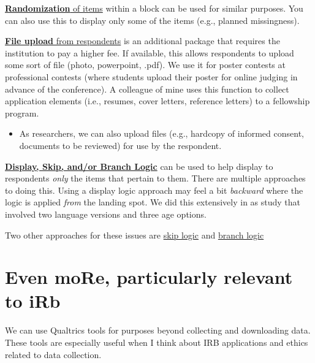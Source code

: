 \documentclass[
  english,
]{book}
\providecommand{\tightlist}{%
  \setlength{\itemsep}{0pt}\setlength{\parskip}{0pt}}
\begin{document}
\href{https://www.qualtrics.com/support/survey-platform/survey-module/block-options/question-randomization/}{\textbf{Randomization} of items} within a block can be used for similar purposes. You can also use this to display only some of the items (e.g., planned missingness).

\href{https://www.qualtrics.com/support/survey-platform/survey-module/editing-questions/question-types-guide/advanced/file-upload/}{\textbf{File upload} from respondents} is an additional package that requires the institution to pay a higher fee. If available, this allows respondents to upload some sort of file (photo, powerpoint, .pdf). We use it for poster contests at professional contests (where students upload their poster for online judging in advance of the conference). A colleague of mine uses this function to collect application elements (i.e., resumes, cover letters, reference letters) to a fellowship program.

\begin{itemize}
\tightlist
\item
  As researchers, we can also upload files (e.g., hardcopy of informed consent, documents to be reviewed) for use by the respondent.
\end{itemize}

\href{https://www.qualtrics.com/support/survey-platform/survey-module/question-options/display-logic/}{\textbf{Display, Skip, and/or Branch Logic}} can be used to help display to respondents \emph{only} the items that pertain to them. There are multiple approaches to doing this. Using a display logic approach may feel a bit \emph{backward} where the logic is applied \emph{from} the landing spot. We did this extensively in as study that involved two language versions and three age options.

Two other approaches for these issues are \href{https://www.qualtrics.com/support/survey-platform/survey-module/question-options/skip-logic/}{skip logic} and \href{https://www.qualtrics.com/support/survey-platform/survey-module/survey-flow/standard-elements/branch-logic/}{branch logic}

\hypertarget{even-more-particularly-relevant-to-irb}{%
\section{Even moRe, particularly relevant to iRb}\label{even-more-particularly-relevant-to-irb}}

We can use Qualtrics tools for purposes beyond collecting and downloading data. These tools are especially useful when I think about IRB applications and ethics related to data collection.
\end{document}

